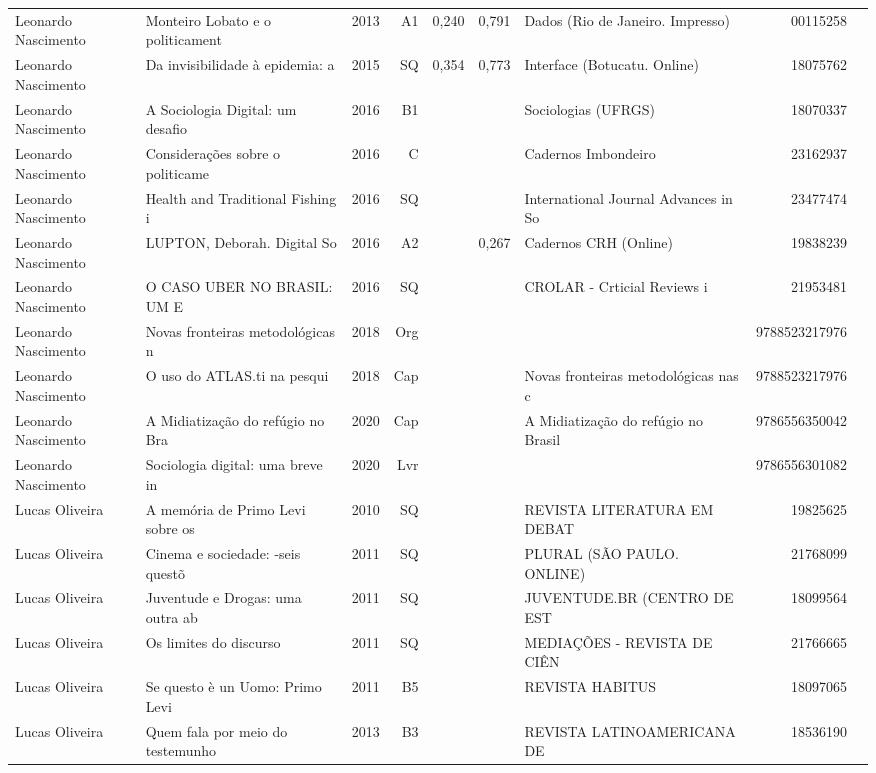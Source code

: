 \documentclass[12pt,brazil]{article}\usepackage[]{graphicx}\usepackage[]{xcolor}
\begin{document}
\begin{longtable}{lllrrllrr}
Leonardo Nascimento & Monteiro Lobato e o politicament & 2013 & A1 & 0,240 & 0,791 & Dados (Rio de Janeiro. Impresso) & 00115258 \\
Leonardo Nascimento & Da invisibilidade à epidemia: a  & 2015 & SQ & 0,354 & 0,773 & Interface (Botucatu. Online) & 18075762 \\
Leonardo Nascimento & A Sociologia Digital: um desafio & 2016 & B1 &  &  & Sociologias (UFRGS) & 18070337 \\
Leonardo Nascimento & Considerações sobre o politicame & 2016 & C &  &  & Cadernos Imbondeiro & 23162937 \\
\rowcolor{coautr}Leonardo Nascimento & Health and Traditional Fishing i & 2016 & SQ &  &  & International Journal Advances in So & 23477474 \\
Leonardo Nascimento & LUPTON, Deborah. Digital So & 2016 & A2 &  & 0,267 & Cadernos CRH (Online) & 19838239 \\
Leonardo Nascimento & O CASO UBER NO BRASIL: UM E & 2016 & SQ &  &  & CROLAR - Crticial Reviews i & 21953481 \\
Leonardo Nascimento & Novas fronteiras metodológicas n & 2018 & Org &  &  &  & 9788523217976 \\
Leonardo Nascimento & O uso do ATLAS.ti na pesqui & 2018 & Cap &  &  & Novas fronteiras metodológicas nas c & 9788523217976 \\
Leonardo Nascimento & A Midiatização do refúgio no Bra & 2020 & Cap &  &  & A Midiatização do refúgio no Brasil  & 9786556350042 \\
Leonardo Nascimento & Sociologia digital: uma breve in & 2020 & Lvr &  &  &  & 9786556301082 \\
Lucas Oliveira & A memória de Primo Levi sobre os & 2010 & SQ &  &  & REVISTA LITERATURA EM DEBAT & 19825625 \\
Lucas Oliveira & Cinema e sociedade: -seis questõ & 2011 & SQ &  &  & PLURAL (SÃO PAULO. ONLINE) & 21768099 \\
Lucas Oliveira & Juventude e Drogas: uma outra ab & 2011 & SQ &  &  & JUVENTUDE.BR (CENTRO DE EST & 18099564 \\
Lucas Oliveira & Os limites do discurso & 2011 & SQ &  &  & MEDIAÇÕES - REVISTA DE CIÊN & 21766665 \\
Lucas Oliveira & Se questo è un Uomo: Primo Levi  & 2011 & B5 &  &  & REVISTA HABITUS & 18097065 \\
Lucas Oliveira & Quem fala por meio do testemunho & 2013 & B3 &  &  & REVISTA LATINOAMERICANA DE  & 18536190 \\

\end{longtable}
\end{document}
